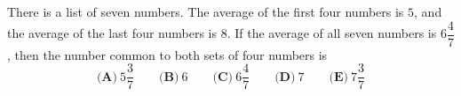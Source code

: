 There is a list of seven numbers. The average of the first four numbers is $5$, and the average of the last four numbers is $8$. If the average of all seven numbers is $6\dfrac47$, then the number common to both sets of four numbers is
\[\textbf{(A)}\ 5\dfrac37\qquad\textbf{(B)}\ 6\qquad\textbf{(C)}\ 6\dfrac47\qquad\textbf{(D)}\ 7\qquad\textbf{(E)}\ 7\dfrac37\]
